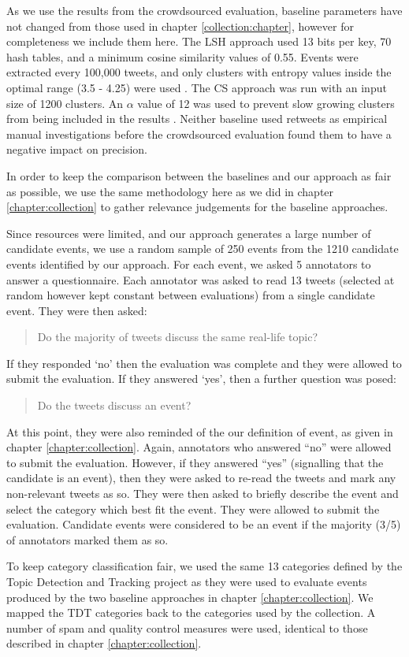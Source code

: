 As we use the results from the crowdsourced evaluation, baseline parameters have not changed from those used in chapter \ref{collection:chapter}, however for completeness we include them here.
The LSH approach used 13 bits per key, 70 hash tables, and a minimum cosine similarity values of 0.55. Events were extracted every 100,000 tweets, and only clusters with entropy values inside the optimal range (3.5 - 4.25) were used \citep{Petrovic10}.
The CS approach was run with an input size of 1200 clusters. An \(\alpha\) value of 12 was used to prevent slow growing clusters from being included in the results \citep{Aggarwal12}.
Neither baseline used retweets as empirical manual investigations before the crowdsourced evaluation found them to have a negative impact on precision.

\label{detection:sec:crowd}
In order to keep the comparison between the baselines and our approach as fair as possible, we use the same methodology here as we did in chapter \ref{chapter:collection} to gather relevance judgements for the baseline approaches.

Since resources were limited, and our approach generates a large number of candidate events, we use a random sample of 250 events from the 1210 candidate events identified by our approach.
For each event, we asked 5 annotators to answer a questionnaire.
Each annotator was asked to read 13 tweets (selected at random however kept constant between evaluations) from a single candidate event.
They were then asked: \blockquote{Do the majority of tweets discuss the same real-life topic?}.
If they responded `no' then the evaluation was complete and they were allowed to submit the evaluation.
If they answered `yes', then a further question was posed:
\blockquote{Do the tweets discuss an event?}.
At this point, they were also reminded of the our definition of event, as given in chapter \ref{chapter:collection}.
Again, annotators who answered ``no'' were allowed to submit the evaluation.
However, if they answered ``yes'' (signalling that the candidate is an event), then they were asked to re-read the tweets and mark any non-relevant tweets as so.
They were then asked to briefly describe the event and select the category which best fit the event.
They were allowed to submit the evaluation.
Candidate events were considered to be an event if the majority (3/5) of annotators marked them as so.

To keep category classification fair, we used the same 13 categories defined by the Topic Detection and Tracking project \citep{Allan:2002:ITD:772260.772262} as they were used to evaluate events produced by the two baseline approaches in chapter \ref{chapter:collection}. We mapped the TDT categories back to the categories used by the collection.
A number of spam and quality control measures were used, identical to those described in chapter \ref{chapter:collection}.